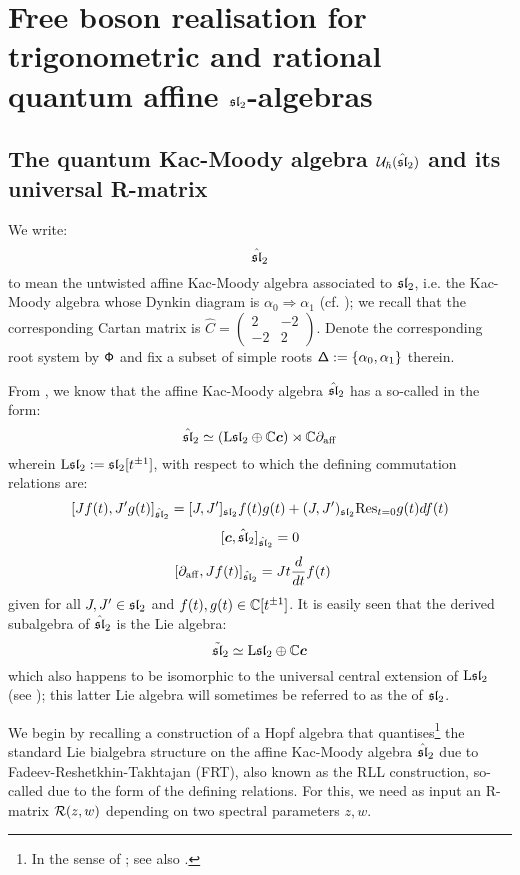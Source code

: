 \section{\texorpdfstring{Free boson realisation for trigonometric and rational quantum affine $\sl_2$-algebras}{}}
    \subsection{\texorpdfstring{The quantum Kac-Moody algebra $\calU_{\hbar}(\hat{\sl}_2)$ and its universal R-matrix}{}}
        We write:
            $$\hat{\sl}_2$$
        to mean the untwisted affine Kac-Moody algebra associated to $\sl_2$, i.e. the Kac-Moody algebra whose Dynkin diagram is $\alpha_0 \Rightarrow \alpha_1$ (cf. \cite[Chapters 4 and 7]{kac_infinite_dimensional_lie_algebras}); we recall that the corresponding Cartan matrix is $\hat{C} = \begin{pmatrix} 2 & -2 \\ -2 & 2 \end{pmatrix}$. Denote the corresponding root system by $\rootsystem$ and fix a subset of simple roots $\simpleroots := \{\alpha_0, \alpha_1\}$ therein.
        
        From \cite[Chapter 7]{kac_infinite_dimensional_lie_algebras}, we know that the affine Kac-Moody algebra $\hat{\sl}_2$ has a so-called  in the form:
            $$\hat{\sl}_2 \cong ( \Loop \sl_2 \oplus \bbC \level ) \rtimes \bbC \del_{\aff}$$
        wherein $\Loop \sl_2 := \sl_2[t^{\pm 1}]$, with respect to which the defining commutation relations are:
            $$[J f(t), J'g(t)]_{\hat{\sl}_2} = [J, J']_{\sl_2} f(t) g(t) + (J, J')_{\sl_2} \Res_{t = 0} g(t) df(t)$$
            $$[\level, \hat{\sl}_2]_{\hat{\sl}_2} = 0$$
            $$[\del_{\aff}, J f(t)]_{\hat{\sl}_2} = J t\frac{d}{dt} f(t) \quad$$
        given for all $J, J' \in \sl_2$ and $f(t), g(t) \in \bbC[t^{\pm 1}]$. It is easily seen that the derived subalgebra of $\hat{\sl}_2$ is the Lie algebra:
            $$\tilde{\sl}_2 \cong \Loop \sl_2 \oplus \bbC \level$$
        which also happens to be isomorphic to the universal central extension of $\Loop \sl_2$ (see \cite{kassel_universal_central_extensions_of_lie_algebras}); this latter Lie algebra will sometimes be referred to as the  of $\sl_2$.
    
        We begin by recalling a construction of a Hopf algebra that quantises\footnote{In the sense of \cite{etingof_kazhdan_quantisation_1}; see also \cite{etingof_kazhdan_quantisation_6}.} the standard Lie bialgebra structure on the affine Kac-Moody algebra $\hat{\sl}_2$ due to Fadeev-Reshetkhin-Takhtajan (FRT), also known as the RLL construction, so-called due to the form of the defining relations. For this, we need as input an R-matrix $\calR(z, w)$ depending on two spectral parameters $z, w$.

